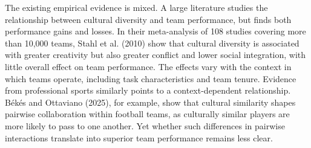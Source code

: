 \documentclass[10pt]{article}
\begin{document}
The existing empirical evidence is mixed. A large literature studies the relationship between cultural diversity and team performance, but finds both performance gains and losses. In their meta-analysis of 108 studies covering more than 10,000 teams, Stahl et al. (2010) show that cultural diversity is associated with greater creativity but also greater conflict and lower social integration, with little overall effect on team performance. The effects vary with the context in which teams operate, including task characteristics and team tenure. Evidence from professional sports similarly points to a context-dependent relationship. Békés and Ottaviano (2025), for example, show that cultural similarity shapes pairwise collaboration within  football teams, as culturally similar players are more likely to pass to one another. Yet whether such differences in pairwise interactions translate into superior team performance remains less clear.

\end{document}
